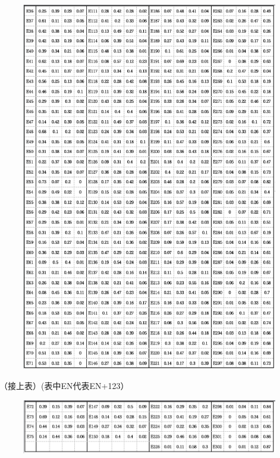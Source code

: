 \documentclass[bwprint]{cumcm}
\begin{document}
\begin{appendices}
\begin{figure}[h]
	\includegraphics[width=0.95\linewidth]{figures/figure7.jpg}  %
	\label{fig:mcmthesis-logo}   %
\end{figure}
\newpage

（接上表）(表中EN代表EN+123）
 \begin{figure}[h]%
	\centering  %
	\includegraphics[width=0.95\linewidth]{figures/figure8.jpg}  %
	\label{fig:mcmthesis-logo}   %
\end{figure}


\end{appendices}
\end{document}
